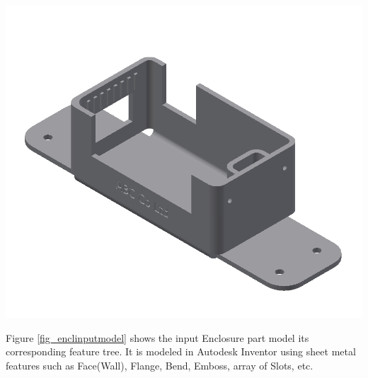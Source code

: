 \begin{minipage}{\linewidth}
\begin{minipage}[c]{0.62\linewidth}
\includegraphics[width=\linewidth,valign=t]{images/SheetMetal_Medium_Enclosure_OriginalPart}
 \label{fig_enclinputmodel}

\bigskip

 Figure \ref{fig_enclinputmodel} shows the input Enclosure part model its corresponding feature tree. It is modeled in Autodesk Inventor using sheet metal features such as Face(Wall), Flange, Bend, Emboss, array of Slots, etc. 
 

\end{minipage}
\end{minipage}
